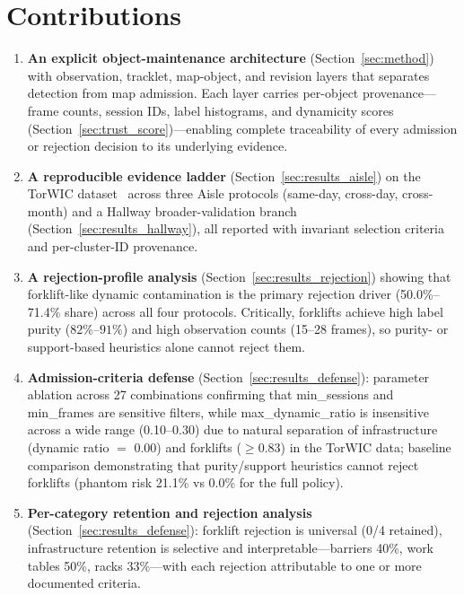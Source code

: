 \documentclass[journal]{IEEEtran}
\begin{document}
\section{Contributions}
\label{sec:contributions}

\begin{enumerate}
  \item \textbf{An explicit object-maintenance architecture} (Section~\ref{sec:method}) with observation, tracklet, map-object, and revision layers that separates detection from map admission. Each layer carries per-object provenance---frame counts, session IDs, label histograms, and dynamicity scores (Section~\ref{sec:trust_score})---enabling complete traceability of every admission or rejection decision to its underlying evidence.
  
  \item \textbf{A reproducible evidence ladder} (Section~\ref{sec:results_aisle}) on the TorWIC dataset~\cite{barath2023povslam} across three Aisle protocols (same-day, cross-day, cross-month) and a Hallway broader-validation branch (Section~\ref{sec:results_hallway}), all reported with invariant selection criteria and per-cluster-ID provenance.
  
  \item \textbf{A rejection-profile analysis} (Section~\ref{sec:results_rejection}) showing that forklift-like dynamic contamination is the primary rejection driver (50.0\%--71.4\% share) across all four protocols. Critically, forklifts achieve high label purity ($82\%$--$91\%$) and high observation counts (15--28 frames), so purity- or support-based heuristics alone cannot reject them.
  
  \item \textbf{Admission-criteria defense} (Section~\ref{sec:results_defense}): parameter ablation across 27 combinations confirming that min\_sessions and min\_frames are sensitive filters, while max\_dynamic\_ratio is insensitive across a wide range (0.10--0.30) due to natural separation of infrastructure (dynamic ratio $=$ 0.00) and forklifts ($\geq 0.83$) in the TorWIC data; baseline comparison demonstrating that purity/support heuristics cannot reject forklifts (phantom risk 21.1\% vs 0.0\% for the full policy).
  
  \item \textbf{Per-category retention and rejection analysis} (Section~\ref{sec:results_defense}): forklift rejection is universal (0/4 retained), infrastructure retention is selective and interpretable---barriers 40\%, work tables 50\%, racks 33\%---with each rejection attributable to one or more documented criteria.
  

\end{enumerate}
\end{document}
